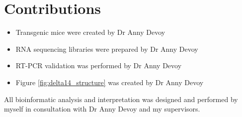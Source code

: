 \section{Contributions}
\begin{itemize}
	\item Transgenic mice were created by Dr Anny Devoy
	\item RNA sequencing libraries were prepared by Dr Anny Devoy
	\item RT-PCR validation was performed by Dr Anny Devoy
	\item Figure \ref{fig:delta14_structure} was created by Dr Anny Devoy
\end{itemize}
All bioinformatic analysis and interpretation was designed and performed by myself in consultation with Dr Anny Devoy and my supervisors. 





%

%
%
%

